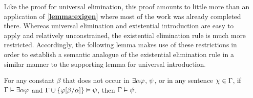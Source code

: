 Like the proof for universal elimination, this proof amounts to little more than an application of \textbf{\ref{lemma:exigen}} where most of the work was already completed there.
Whereas universal elimination and existential introduction are easy to apply and relatively unconstrained, the existential elimination rule is much more restricted.
Accordingly, the following lemma makes use of these restrictions in order to establish a semantic analogue of the existential elimination rule in a similar manner to the supporting lemma for universal introduction.



\begin{Lthm} \label{lemma:exiinst}
  For any constant $\beta$ that does not occur in $\exists\alpha\varphi$, $\psi$, or in any sentence $\chi\in\Gamma$, if $\Gamma \vDash \exists\alpha\varphi$ and $\Gamma \cup \lbrace\varphi[\beta/\alpha]\rbrace \vDash \psi$, then $\Gamma \vDash \psi$.
\end{Lthm}

